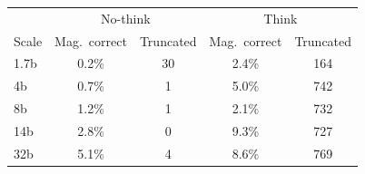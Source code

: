 \begin{tabular}{lcccc}
\toprule
 & \multicolumn{2}{c}{No-think} & \multicolumn{2}{c}{Think}\\
Scale & Mag.\ correct & Truncated & Mag.\ correct & Truncated\\
\midrule
1.7b & 0.2\% & 30 & 2.4\% & 164 \\
4b & 0.7\% & 1 & 5.0\% & 742 \\
8b & 1.2\% & 1 & 2.1\% & 732 \\
14b & 2.8\% & 0 & 9.3\% & 727 \\
32b & 5.1\% & 4 & 8.6\% & 769 \\
\bottomrule
\end{tabular}
